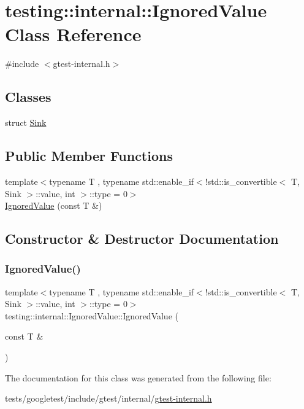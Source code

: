 \hypertarget{classtesting_1_1internal_1_1IgnoredValue}{}\section{testing\+:\+:internal\+:\+:Ignored\+Value Class Reference}
\label{classtesting_1_1internal_1_1IgnoredValue}


{\ttfamily \#include $<$gtest-\/internal.\+h$>$}

\subsection*{Classes}
\begin{DoxyCompactItemize}
\item 
struct \hyperlink{structtesting_1_1internal_1_1IgnoredValue_1_1Sink}{Sink}
\end{DoxyCompactItemize}
\subsection*{Public Member Functions}
\begin{DoxyCompactItemize}
\item 
{\footnotesize template$<$typename T , typename std\+::enable\+\_\+if$<$!std\+::is\+\_\+convertible$<$ T, Sink $>$\+::value, int $>$\+::type  = 0$>$ }\\\hyperlink{classtesting_1_1internal_1_1IgnoredValue_a851d14f6c0f584d5c5a49ddbc06d6538}{Ignored\+Value} (const T \&)
\end{DoxyCompactItemize}


\subsection{Constructor \& Destructor Documentation}
\mbox{\label{classtesting_1_1internal_1_1IgnoredValue_a851d14f6c0f584d5c5a49ddbc06d6538}} 
\subsubsection{\texorpdfstring{Ignored\+Value()}{IgnoredValue()}}
{\footnotesize\ttfamily template$<$typename T , typename std\+::enable\+\_\+if$<$!std\+::is\+\_\+convertible$<$ T, Sink $>$\+::value, int $>$\+::type  = 0$>$ \\
testing\+::internal\+::\+Ignored\+Value\+::\+Ignored\+Value (\begin{DoxyParamCaption}\item[{const T \&}]{ }\end{DoxyParamCaption})\hspace{0.3cm}{\ttfamily [inline]}}



The documentation for this class was generated from the following file\+:\begin{DoxyCompactItemize}
\item 
tests/googletest/include/gtest/internal/\hyperlink{gtest-internal_8h}{gtest-\/internal.\+h}\end{DoxyCompactItemize}
